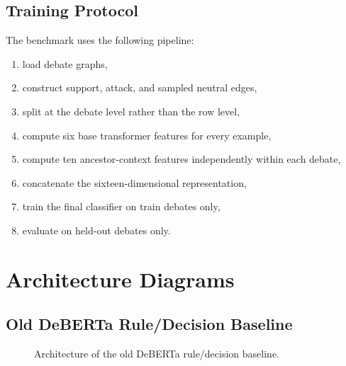 \documentclass[11pt,a4paper]{article}
\begin{document}
\subsection{Training Protocol}
The benchmark uses the following pipeline:
\begin{enumerate}[label=\arabic*.]
  \item load debate graphs,
  \item construct support, attack, and sampled neutral edges,
  \item split at the debate level rather than the row level,
  \item compute six base transformer features for every example,
  \item compute ten ancestor-context features independently within each debate,
  \item concatenate the sixteen-dimensional representation,
  \item train the final classifier on train debates only,
  \item evaluate on held-out debates only.
\end{enumerate}

\section{Architecture Diagrams}
\subsection{Old DeBERTa Rule/Decision Baseline}
\begin{figure}[htbp]
\centering
{}
\caption{Architecture of the old DeBERTa rule/decision baseline.}
\end{figure}
\end{document}

